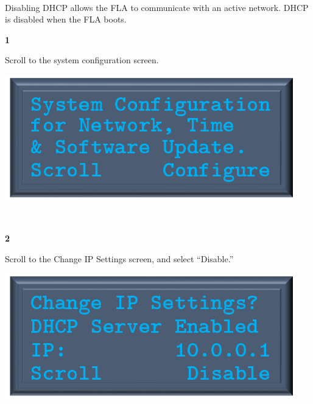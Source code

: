\documentclass[11pt, oneside]{book}
\begin{document}
\paragraph{  }
Disabling DHCP allows the FLA to communicate with an active network. DHCP is disabled when the FLA boots.
\\[\baselineskip]
\noindent\begin{minipage}{0.45\textwidth}%
\begin{center}
\textbf{1}\\[\baselineskip]
\end{center}
Scroll to the system configuration screen.
\end{minipage}%
\hfill%
\begin{minipage}{0.45\textwidth}
\includegraphics[width=\linewidth]{../media/pstricks_files/06_system_configuration}
\end{minipage}
\\[\baselineskip]
\noindent\begin{minipage}{0.45\textwidth}%
\begin{center}
\textbf{2}\\[\baselineskip]
\end{center}
Scroll to the Change IP Settings screen, and select ``Disable.''
\end{minipage}%
\hfill%
\begin{minipage}{0.45\textwidth}
\includegraphics[width=\linewidth]{../media/pstricks_files/08_dhcp_server_enabled}
\end{minipage}
\end{document}
